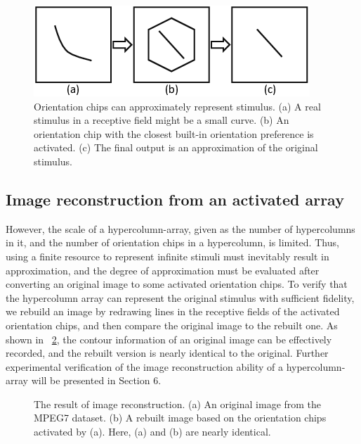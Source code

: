 \documentclass{article}
\begin{document}
\begin{figure}[!t]
\centering
\includegraphics[width=0.45\linewidth]{images/fig6.png}
\caption{Orientation chips can approximately represent stimulus. 
(a) A real stimulus in a receptive field might be a small curve. 
(b) An orientation chip with the closest built-in orientation preference is activated. 
(c) The final output is an approximation of the original stimulus.}
\label{fig:6}
\end{figure}

\subsection{Image reconstruction from an activated array}

However, the scale of a hypercolumn-array, given as the number of hypercolumns in it, 
and the number of orientation chips in a hypercolumn, is limited. 
Thus, using a finite resource to represent infinite stimuli must inevitably result in approximation, 
and the degree of approximation must be evaluated after converting an original image to some activated orientation chips. 
To verify that the hypercolumn array can represent the original stimulus with sufficient fidelity, 
we rebuild an image by redrawing lines in the receptive fields of the activated orientation chips, 
and then compare the original image to the rebuilt one. 
As shown in \figurename~\ref{fig:7}, 
the contour information of an original image can be effectively recorded, 
and the rebuilt version is nearly identical to the original. 
Further experimental verification of the image reconstruction ability of a hypercolumn-array will be presented in Section 6.

\begin{figure}[!t]
\centering
{}
\hfil
{}
\caption{The result of image reconstruction. (a) An original image from the MPEG7 dataset. (b) A rebuilt image based on the orientation chips activated by (a). Here, (a) and (b) are nearly identical.}
\label{fig:7}
\end{figure}
\end{document}
